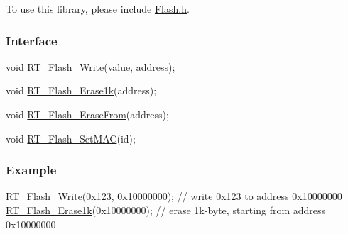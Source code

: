 To use this library, please include {\ttfamily \mbox{\hyperlink{a00008}{Flash.\+h}}}.

\subsubsection*{Interface}


\begin{DoxyCode}
\textcolor{keywordtype}{void} \mbox{\hyperlink{a00008_a13fb43316f72b3b1b9467a91fca08d5c}{RT\_Flash\_Write}}(value, address);

\textcolor{keywordtype}{void} \mbox{\hyperlink{a00008_ab65db3c66c91da3a934540a2f8175803}{RT\_Flash\_Erase1k}}(address);

\textcolor{keywordtype}{void} \mbox{\hyperlink{a00008_afb9cdf54d7254cfef685cd4012113b27}{RT\_Flash\_EraseFrom}}(address);

\textcolor{keywordtype}{void} \mbox{\hyperlink{a00008_a99ec94a33a9126a436139061d9e0136b}{RT\_Flash\_SetMAC}}(\textcolor{keywordtype}{id});
\end{DoxyCode}


\subsubsection*{Example}


\begin{DoxyCode}
\mbox{\hyperlink{a00008_a13fb43316f72b3b1b9467a91fca08d5c}{RT\_Flash\_Write}}(0x123, 0x10000000);     \textcolor{comment}{// write 0x123 to address 0x10000000}
\mbox{\hyperlink{a00008_ab65db3c66c91da3a934540a2f8175803}{RT\_Flash\_Erase1k}}(0x10000000);          \textcolor{comment}{// erase 1k-byte, starting from address 0x10000000}
\end{DoxyCode}
 